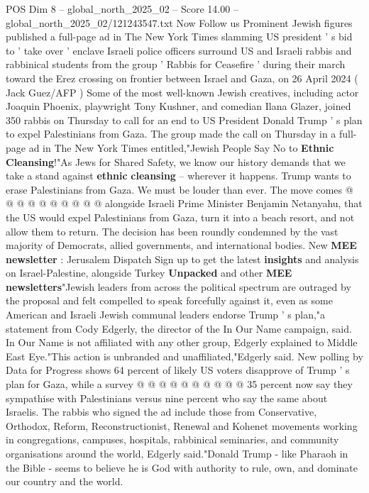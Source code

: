 \begin{textsample}{POS Dim 8 – global\_north\_2025\_02 – Score 14.00 – global\_north\_2025\_02/121243547.txt}  \label{ex:f8_pos_007}
Now Follow us Prominent Jewish figures published a full-page ad in The New York Times slamming US president ' s bid to ' take over ' enclave Israeli police officers surround US and Israeli rabbis and rabbinical students from the group ' Rabbis for Ceasefire ' during their march toward the Erez crossing on frontier between Israel and Gaza, on 26 April 2024 ( Jack Guez/AFP ) Some of the most well-known Jewish creatives, including actor Joaquin Phoenix, playwright Tony Kushner, and comedian Ilana Glazer, joined 350 rabbis on Thursday to call for an end to US President Donald Trump ' s plan to expel Palestinians from Gaza.
The group made the call on Thursday in a full-page ad in The New York Times entitled,"Jewish People Say No to \textbf{Ethnic} \textbf{Cleansing}!"As Jews for Shared Safety, we know our history demands that we take a stand against \textbf{ethnic} \textbf{cleansing} -- wherever it happens.
Trump wants to erase Palestinians from Gaza.
We must be louder than ever.
The move comes @ @ @ @ @ @ @ @ @ @ alongside Israeli Prime Minister Benjamin Netanyahu, that the US would expel Palestinians from Gaza, turn it into a beach resort, and not allow them to return.
The decision has been roundly condemned by the vast majority of Democrats, allied governments, and international bodies.
New \textbf{MEE} \textbf{newsletter} : Jerusalem Dispatch Sign up to get the latest \textbf{insights} and analysis on Israel-Palestine, alongside Turkey \textbf{Unpacked} and other \textbf{MEE} \textbf{newsletters}"Jewish leaders from across the political spectrum are outraged by the proposal and felt compelled to speak forcefully against it, even as some American and Israeli Jewish communal leaders endorse Trump ' s plan,"a statement from Cody Edgerly, the director of the In Our Name campaign, said.
In Our Name is not affiliated with any other group, Edgerly explained to Middle East Eye."This action is unbranded and unaffiliated,"Edgerly said.
New polling by Data for Progress shows 64 percent of likely US voters disapprove of Trump ' s plan for Gaza, while a survey @ @ @ @ @ @ @ @ @ @ 35 percent now say they sympathise with Palestinians versus nine percent who say the same about Israelis.
The rabbis who signed the ad include those from Conservative, Orthodox, Reform, Reconstructionist, Renewal and Kohenet movements working in congregations, campuses, hospitals, rabbinical seminaries, and community organisations around the world, Edgerly said."Donald Trump - like Pharaoh in the Bible - seems to believe he is God with authority to rule, own, and dominate our country and the world.

\end{textsample}
